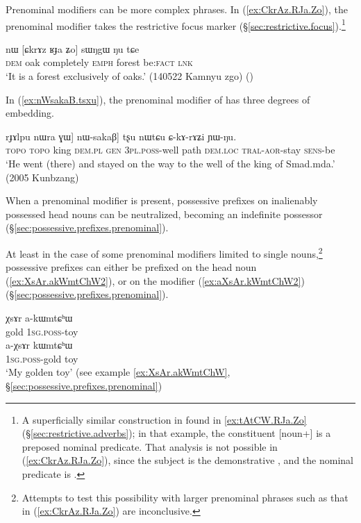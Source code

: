 Prenominal modifiers can be more complex phrases. In (\ref{ex:CkrAz.RJa.Zo}), the prenominal modifier  takes the restrictive focus marker   (§\ref{sec:restrictive.focus}).\footnote{A superficially similar construction in found in \ref{ex:tAtCW.RJa.Zo} (§\ref{sec:restrictive.adverbs}); in that example, the constituent [noun+] is a preposed nominal predicate. That analysis is not possible in (\ref{ex:CkrAz.RJa.Zo}), since the subject is the demonstrative , and the nominal predicate is . } 
 
\begin{exe}
\ex \label{ex:CkrAz.RJa.Zo}
 \gll nɯ [ɕkrɤz ʁɟa ʑo] sɯŋgɯ ŋu tɕe \\
 \textsc{dem} oak completely \textsc{emph} forest be:\textsc{fact} \textsc{lnk} \\
 \glt `It is a forest exclusively of oaks.' (140522 Kamnyu zgo)
()
\end{exe}

In (\ref{ex:nWsakaB.tsxu}), the prenominal modifier of  has three degrees of embedding.

\begin{exe}
\ex \label{ex:nWsakaB.tsxu}
\gll [[[smɤt tɯmda] rɟɤlpu nɯra ɣɯ] nɯ-sakaβ] tʂu nɯtɕu ɕ-kɤ-rɤʑi ɲɯ-ŋu. \\
\textsc{topo}  \textsc{topo} king \textsc{dem}.\textsc{pl} \textsc{gen} \textsc{3pl}.\textsc{poss}-well path \textsc{dem}.\textsc{loc} \textsc{tral}-\textsc{aor}-stay \textsc{sens}-be \\
\glt `He went (there) and stayed on the way to the well of the king of Smad.mda.' (2005 Kunbzang)
\end{exe}

When a prenominal modifier is present, possessive prefixes on inalienably possessed head nouns can be neutralized, becoming an indefinite possessor  (§\ref{sec:possessive.prefixes.prenominal}). 

At least in the case of some prenominal modifiers limited to single nouns,\footnote{Attempts to test this possibility with larger prenominal phrases such as that in (\ref{ex:CkrAz.RJa.Zo}) are inconclusive. } possessive prefixes can either be prefixed on the head noun (\ref{ex:XsAr.akWmtChW2}), or on the modifier (\ref{ex:aXsAr.kWmtChW2}) (§\ref{sec:possessive.prefixes.prenominal}).

\begin{exe}
\ex \label{ex:XsAr.kWmtChW}
\begin{xlist}
\ex \label{ex:XsAr.akWmtChW2}
\gll χsɤr a-kɯmtɕʰɯ \\
gold \textsc{1sg}.\textsc{poss}-toy \\
\ex \label{ex:aXsAr.kWmtChW2}
\gll a-χsɤr kɯmtɕʰɯ \\
\textsc{1sg}.\textsc{poss}-gold toy  \\
\glt `My golden toy' (see example \ref{ex:XsAr.akWmtChW}, §\ref{sec:possessive.prefixes.prenominal})
\end{xlist}
\end{exe}

